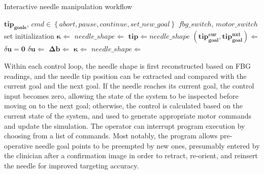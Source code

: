 \begin{algorithm}[h!]
\caption{Interactive needle manipulation workflow} \label{alg:chap-3-workflow}
\begin{algorithmic}[1]
  \Require  $\mathbf{tip_{goals}}$, \newline
  \hspace*{0.6cm} $cmd\in\left\{ abort, pause, continue, set\_new\_goal \right\}$
  \Ensure $fbg\_switch$, $motor\_switch$ set
  \State initialization
          \State $\boldsymbol \kappa \Leftarrow$ 
      \EndIf
      \State $needle\_shape \Leftarrow$ 
      \State $\mathbf{tip} \Leftarrow needle\_shape$
      \State $\left(\mathbf{tip_{goal}^{cur}}, \mathbf{tip_{goal}^{nxt}}  \right) \Leftarrow $
       
          \State $\delta\mathbf{u} = \mathbf{0}$ 
      \Else
          \State $\delta\mathbf{u} \Leftarrow$ 
      \EndIf
      \State $\boldsymbol\Delta\mathbf{b} \Leftarrow $
          \State $\boldsymbol \kappa \Leftarrow$ 
      \EndIf
      \State $needle\_shape \Leftarrow$ 
          \State {}
      \EndIf
      \State {}
  \EndWhile
\end{algorithmic}
\end{algorithm}

Within each control loop, the needle shape is first reconstructed based on FBG readings, and the needle tip position can be extracted and compared with the current goal and the next goal. If the needle reaches its current goal, the control input becomes zero, allowing the state of the system to be inspected before moving on to the next goal; otherwise, the control is calculated based on the current state of the system, and used to generate appropriate motor commands and update the simulation. The operator can interrupt program execution by choosing from a list of commands. Most notably, the program allows pre-operative needle goal points to be preempted by new ones, presumably entered by the clinician after a confirmation image in order to retract, re-orient, and reinsert the needle for improved targeting accuracy.

